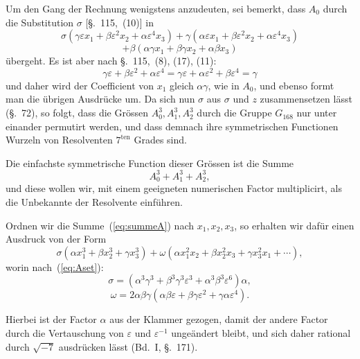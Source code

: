 \documentclass[12pt,a4paper]{article}
\begin{document}
Um den Gang der Rechnung wenigstens anzudeuten, sei bemerkt, dass $A_0$ durch die Substitution $\sigma$ [\S.~115,~(10)] in
\[\sigma(\gamma\varepsilon x_1 + \beta\varepsilon^2 x_2 + \alpha\varepsilon^4 x_3) + \gamma(\alpha\varepsilon x_1 + \beta\varepsilon^2 x_2 + \alpha\varepsilon^4 x_3)\]
\[+ \beta(\alpha\gamma x_1 + \beta\gamma x_2 + \alpha\beta x_3)\]
\"ubergeht. Es ist aber nach \S.~115,~(8), (17), (11):
\[\gamma\varepsilon + \beta\varepsilon^2 + \alpha\varepsilon^4 = \gamma\varepsilon + \alpha\varepsilon^2 + \beta\varepsilon^4 = \gamma\]
und daher wird der Coefficient von $x_1$ gleich $\alpha\gamma$, wie in $A_0$, und ebenso formt man die \"ubrigen Ausdr\"ucke um. Da sich nun $\sigma$ aus $\sigma$ und $z$ zusammensetzen l\"asst (\S.~72), so folgt, dass die Gr\"ossen $A_0^3, A_1^3, A_2^3$ durch die Gruppe $G_{168}$ nur unter einander permutirt werden, und dass demnach ihre symmetrischen Functionen Wurzeln von Resolventen $7^{\text{ten}}$ Grades sind.

Die einfachste symmetrische Function dieser Gr\"ossen ist die Summe
\begin{equation}
\label{eq:summeA} A_0^3 + A_1^3 + A_2^3,
\end{equation}
und diese wollen wir, mit einem geeigneten numerischen Factor multiplicirt, als die Unbekannte der Resolvente einf\"uhren.

Ordnen wir die Summe~(\ref{eq:summeA}) nach $x_1, x_2, x_3$, so erhalten wir daf\"ur einen Ausdruck von der Form
\[\sigma(\alpha x_1^3 + \beta x_2^3 + \gamma x_3^3) + \omega(\alpha x_1^2 x_2 + \beta x_2^2 x_3 + \gamma x_3^2 x_1 + \cdots),\]
worin nach~(\ref{eq:Aset}):
\[\sigma = (\alpha^3\gamma^3 + \beta^3\gamma^3\varepsilon^3 + \alpha^3\beta^3\varepsilon^6)\alpha,\]
\[\omega = 2\alpha\beta\gamma(\alpha\beta\varepsilon + \beta\gamma\varepsilon^2 + \gamma\alpha\varepsilon^4).\]

Hierbei ist der Factor $\alpha$ aus der Klammer gezogen, damit der andere Factor durch die Vertauschung von $\varepsilon$ und $\varepsilon^{-1}$ unge\"andert bleibt, und sich daher rational durch $\sqrt{-7}$ ausdr\"ucken l\"asst (Bd.~I, \S.~171).
\end{document}
